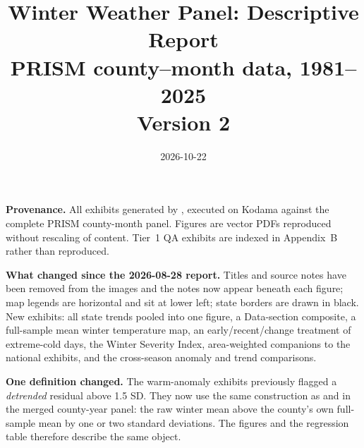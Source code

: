 \documentclass[11pt, english, letterpaper]{article}
\begin{document}
\title{Winter Weather Panel: Descriptive Report\\[4pt]
\large PRISM county--month data, 1981--2025 \\[2pt]
\normalsize Version 2}
\date{2026-10-22}
\maketitle
\thispagestyle{empty}
\vspace{-1em}
\begin{center}\begin{minipage}{0.86\textwidth}\small
\textbf{Provenance.} All exhibits generated by
, executed on Kodama against the
complete PRISM county-month panel. Figures are vector PDFs reproduced without
rescaling of content. Tier~1 QA exhibits are indexed in Appendix~B rather than
reproduced.
\par\vspace{6pt}
\textbf{What changed since the 2026-08-28 report.} Titles and source notes have been
removed from the images and the notes now appear beneath each figure; map legends are
horizontal and sit at lower left; state borders are drawn in black. New exhibits: all
state trends pooled into one figure, a Data-section composite, a full-sample mean
winter temperature map, an early/recent/change treatment of extreme-cold days, the
Winter Severity Index, area-weighted companions to the national exhibits, and the
cross-season anomaly and trend comparisons.
\par\vspace{6pt}
\textbf{One definition changed.} The warm-anomaly exhibits previously flagged a
\emph{detrended} residual above 1.5 SD. They now use the same construction as
 and  in the merged county-year panel:
the raw winter mean above the county's own full-sample mean by one or two standard
deviations. The figures and the regression table therefore describe the same object.
\end{minipage}\end{center}
\newpage
\tableofcontents
\newpage
\end{document}
